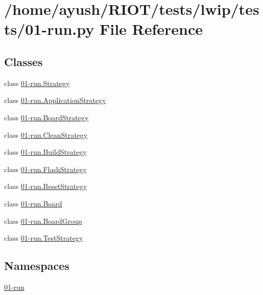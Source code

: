 \hypertarget{lwip_2tests_201-run_8py}{}\section{/home/ayush/\+R\+I\+O\+T/tests/lwip/tests/01-\/run.py File Reference}
\label{lwip_2tests_201-run_8py}
\subsection*{Classes}
\begin{DoxyCompactItemize}
\item 
class \hyperlink{class01-run_1_1Strategy}{01-\/run.\+Strategy}
\item 
class \hyperlink{class01-run_1_1ApplicationStrategy}{01-\/run.\+Application\+Strategy}
\item 
class \hyperlink{class01-run_1_1BoardStrategy}{01-\/run.\+Board\+Strategy}
\item 
class \hyperlink{class01-run_1_1CleanStrategy}{01-\/run.\+Clean\+Strategy}
\item 
class \hyperlink{class01-run_1_1BuildStrategy}{01-\/run.\+Build\+Strategy}
\item 
class \hyperlink{class01-run_1_1FlashStrategy}{01-\/run.\+Flash\+Strategy}
\item 
class \hyperlink{class01-run_1_1ResetStrategy}{01-\/run.\+Reset\+Strategy}
\item 
class \hyperlink{class01-run_1_1Board}{01-\/run.\+Board}
\item 
class \hyperlink{class01-run_1_1BoardGroup}{01-\/run.\+Board\+Group}
\item 
class \hyperlink{class01-run_1_1TestStrategy}{01-\/run.\+Test\+Strategy}
\end{DoxyCompactItemize}
\subsection*{Namespaces}
\begin{DoxyCompactItemize}
\item 
 \hyperlink{namespace01-run}{01-\/run}
\end{DoxyCompactItemize}
